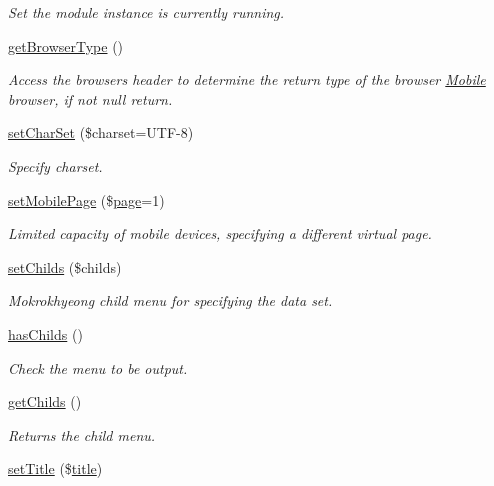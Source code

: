 \begin{DoxyCompactItemize}
\begin{DoxyCompactList}\small\item\em Set the module instance is currently running. \end{DoxyCompactList}\item 
\hyperlink{classmobileXE_a462a4900af63aa2bfbcea2168afbe876}{get\+Browser\+Type} ()
\begin{DoxyCompactList}\small\item\em Access the browser\textquotesingle{}s header to determine the return type of the browser \hyperlink{classMobile}{Mobile} browser, if not null return. \end{DoxyCompactList}\item 
\hyperlink{classmobileXE_abcb54cc8b685d1411acbd667e707d030}{set\+Char\+Set} (\$charset=\textquotesingle{}U\+TF-\/8\textquotesingle{})
\begin{DoxyCompactList}\small\item\em Specify charset. \end{DoxyCompactList}\item 
\hyperlink{classmobileXE_a462ec879b69ab476662754aec66800dd}{set\+Mobile\+Page} (\$\hyperlink{classpage}{page}=1)
\begin{DoxyCompactList}\small\item\em Limited capacity of mobile devices, specifying a different virtual page. \end{DoxyCompactList}\item 
\hyperlink{classmobileXE_a0ea0dec157552b699d23388b257d22a6}{set\+Childs} (\$childs)
\begin{DoxyCompactList}\small\item\em Mokrokhyeong child menu for specifying the data set. \end{DoxyCompactList}\item 
\hyperlink{classmobileXE_a680f6a6b774bf12be4c67b6a9215f1ea}{has\+Childs} ()
\begin{DoxyCompactList}\small\item\em Check the menu to be output. \end{DoxyCompactList}\item 
\hyperlink{classmobileXE_a650f04e4701a5a1ae2ddceeb0f401166}{get\+Childs} ()
\begin{DoxyCompactList}\small\item\em Returns the child menu. \end{DoxyCompactList}\item 
\hyperlink{classmobileXE_a6ae064d89d2b926d7c96f59257692a01}{set\+Title} (\$\hyperlink{ko_8install_8php_a5b072c5fd1d2228c6ba5cee13cd142e3}{title})

\end{DoxyCompactItemize}
